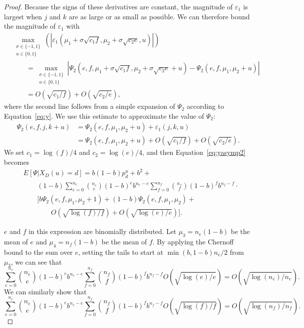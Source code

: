 \documentclass[prodmode,acmtissec]{acmsmall}
\begin{document}
\begin{proof}
Because the signs of these derivatives are constant, the magnitude of $\varepsilon_1$ is largest when $j$ and $k$ are as large or as small as possible.  We can therefore bound the magnitude of $\varepsilon_1$ with
\begin{align*}
&\max_{\substack{\sigma\in \{-1,1\}\\ u\in \{0,1\} }}\left(\left| \varepsilon_1 \left(\mu_1 + \sigma \sqrt{c_1 f},\mu_2 + \sigma \sqrt{c_2 e},u \right) \right| \right)\\
&\qquad = \max_{\substack{\sigma\in \{-1,1\}\\ u\in \{0,1\} }} \left| \Psi_2(e,f,\mu_1 + \sigma \sqrt{c_1 f},\mu_2 + \sigma \sqrt{c_2 e}+u) - \Psi_2(e,f,\mu_1,\mu_2+u) \right|\\
&\qquad = O\left( \sqrt{c_1/f} \right) + O\left( \sqrt{c_2/e} \right),
\end{align*}
where the second line follows from a simple expansion of $\Psi_2$ according to Equation~\ref{eq:y}.  We use this estimate to approximate the value of $\Psi_2$:
\begin{align*}
\Psi_2(e,f,j,k+u) &= \Psi_2(e,f,\mu_1,\mu_2+u) + \varepsilon_1(j,k,u)\\
&= \Psi_2(e,f,\mu_1,\mu_2+u) + O\left( \sqrt{c_1/f} \right) + O\left( \sqrt{c_2/e} \right).
\end{align*}
We set $c_1 = \log(f)/4$ and $c_2 = \log(e)/4$, and then Equation~\ref{eq:yasymp2} becomes
\begin{equation} \label{eq:yasymp2.5}
\begin{split}
  &E[\Psi | X_D(u)=d] = b(1-b)p^u_d + b^2 + \\
  &\qquad (1-b) \sum_{e=0}^{n_e} \binom{n_e}{e} (1-b)^e b^{n_e-e} \sum_{f=0}^{n_f} \binom{n_f}{f} (1-b)^f b^{n_f-f} \cdot\\
  &\qquad \bigg[ b \Psi_2(e,f,\mu_1,\mu_2+1) + (1-b)\Psi_2(e,f,\mu_1,\mu_2) +\\
  &\qquad \qquad O\left( \sqrt{\log(f)/f} \right) + O\left( \sqrt{\log(e)/e} \right) \bigg].
\end{split}
\end{equation}

$e$ and $f$ in this expression are binomially distributed.  Let $\mu_3 = n_e(1-b)$ be the mean of $e$ and $\mu_4 = n_f(1-b)$ be the mean of $f$.  By applying the Chernoff bound to the sum over $e$, setting the tails to start at $\min(b,1-b)n_e/2$ from $\mu_3$, we can see that
\begin{equation*}
\sum_{e=0}^{n_e} \binom{n_e}{e} (1-b)^e b^{n_e-e} \sum_{f=0}^{n_f} \binom{n_f}{f} (1-b)^f b^{n_f-f} O\left(\sqrt{\log(e)/e}\right) = O\left(\sqrt{\log(n_e)/n_e} \right).
\end{equation*}
We can similarly show that
\begin{equation*}
\sum_{e=0}^{n_e} \binom{n_e}{e} (1-b)^e b^{n_e-e} \sum_{f=0}^{n_f} \binom{n_f}{f} (1-b)^f b^{n_f-f} O\left(\sqrt{\log(f)/f} \right) = O\left(\sqrt{\log(n_f)/n_f} \right).
\end{equation*}


\end{proof}
\end{document}
